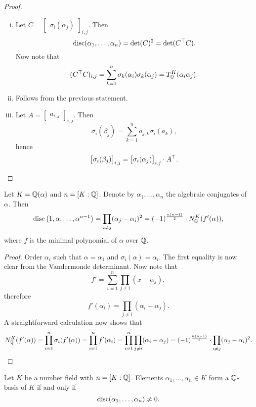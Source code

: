 \pagebreak[3]

\begin{proof}
\phantom{i}
\begin{enumerate}[i)]
\item Let
$C = \begin{bmatrix} \sigma_i(\alpha_j) \end{bmatrix}_{i,j}$. Then
\[
\operatorname{disc}(\alpha_1, \dots, \alpha_n) =
\det(C)^2 =
\det(C^\top C).
\]
Now note that
\[
(C^\top C)_{i,j} =
\sum_{k=1}^n \sigma_k(\alpha_i) \sigma_k(\alpha_j) =
T_{\mathbb{Q}}^K(\alpha_i \alpha_j).
\]
\item Follows from the previous statement.
\item Let $A = \begin{bmatrix} a_{i,j} \end{bmatrix}_{i,j}$. Then
\[
\sigma_i(\beta_j) = \sum_{k=1}^n a_{j,k} \sigma_i(a_k),
\]
hence
\[
\begin{bmatrix}
\sigma_i(\beta_j)
\end{bmatrix}_{i,j} =
\begin{bmatrix}
\sigma_i(\alpha_j)
\end{bmatrix}_{i,j} \cdot
A^\top. \qedhere
\]
\end{enumerate}
\end{proof}

\begin{trditev}
\label{alg_int:prop:disc_norm}
Let $K = \mathbb{Q}(\alpha)$ and $n = [K : \mathbb{Q}]$. Denote by
$\alpha_1, \dots, \alpha_n$ the algebraic conjugates of $\alpha$.
Then
\[
\operatorname{disc} \left(1, \alpha, \dots, \alpha^{n-1}\right) =
\prod_{i \ne j} (\alpha_j - \alpha_i)^2 =
(-1)^{\frac{n(n-1)}{2}} \cdot N_{\mathbb{Q}}^K(f'(\alpha)),
\]
where $f$ is the minimal polynomial of $\alpha$ over $\mathbb{Q}$.
\end{trditev}

\begin{proof}
Order $\alpha_i$ such that $\alpha = \alpha_1$ and
$\sigma_i(\alpha) = \alpha_i$. The first equality is now clear from
the Vandermonde determinant. Now note that
\[
f' =
\sum_{i=1}^n \prod_{j \ne i} (x - \alpha_j),
\]
therefore
\[
f'(\alpha_i) = \prod_{j \ne i} (\alpha_i - \alpha_j).
\]
A straightforward calculation now shows that
\[
N_{\mathbb{Q}}^K(f'(\alpha)) =
\prod_{i=1}^n \sigma_i(f'(\alpha)) =
\prod_{i=1}^n f'(\alpha_i) =
\prod_{i=1}^n \prod_{j \ne i} (\alpha_i - \alpha_j) =
(-1)^{\frac{n(n-1)}{2}} \cdot
\prod_{i \ne j} (\alpha_j - \alpha_i)^2. \qedhere
\]
\end{proof}

\begin{izrek}
Let $K$ be a number field with $n = [K : \mathbb{Q}]$. Elements
$\alpha_1, \dots, \alpha_n \in K$ form a $\mathbb{Q}$-basis of $K$ if and
only if
\[
\operatorname{disc}(\alpha_1, \dots, \alpha_n) \ne 0.
\]
\end{izrek}

